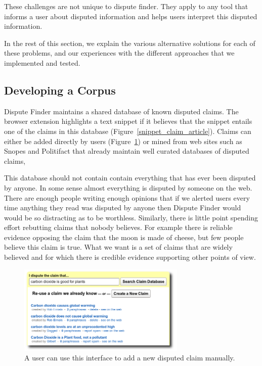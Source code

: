 \documentclass{www2010-submission}
\begin{document}
These challenges are not unique to dispute finder. They apply to any tool that informs a user about disputed information and helps users interpret this disputed information.

In the rest of this section, we explain the various alternative solutions for each of these problems, and our experiences with the different approaches that we implemented and tested.


\subsection{Developing a Corpus}
\label{sec:disputed}

Dispute Finder maintains a shared database of known disputed claims. The browser extension highlights a text snippet if it believes that the snippet entails one of the claims in this database (Figure~\ref{snippet_claim_article}). Claims can either be added directly by users (Figure~\ref{add_claim}) or mined from web sites such as Snopes and Politifact that already maintain well curated databases of disputed claims, 

This database should not contain contain everything that has ever been disputed by anyone. In some sense almost everything is disputed by someone on the web. There are enough people writing enough opinions that if we alerted users every time anything they read was disputed by anyone then Dispute Finder would would be so distracting as to be worthless. Similarly, there is little point spending effort rebutting claims that nobody believes. For example there is reliable evidence opposing the claim that the moon is made of cheese, but few people believe this claim is true. What we want is a set of claims that are widely believed and for which there is credible evidence supporting other points of view.

\begin{figure}[tb]
	\begin{center}
	\includegraphics[width=8cm]{pictures/add_claim_list.png}
	\caption{A user can use this interface to add a new disputed claim manually.}
	\label{add_claim}
	\end{center}
\end{figure}
\end{document}
